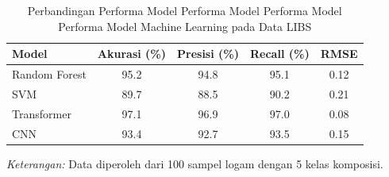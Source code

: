  \begin{table}[H]
    \centering
    \caption{Perbandingan Performa Model Performa Model Performa Model Performa Model Machine Learning pada Data LIBS}
    \label{tab:performa_ml}
    \centering
    \begin{tabular}{lcccc}
      \toprule
      Model & Akurasi (\%) & Presisi (\%) & Recall (\%) & RMSE \\
      \midrule
      Random Forest & 95.2 & 94.8 & 95.1 & 0.12 \\
      SVM & 89.7 & 88.5 & 90.2 & 0.21 \\
      Transformer & 97.1 & 96.9 & 97.0 & 0.08 \\
      CNN & 93.4 & 92.7 & 93.5 & 0.15 \\
      \bottomrule
    \end{tabular}
    
    \smallskip
    \footnotesize
    \textit{Keterangan:} Data diperoleh dari 100 sampel logam dengan 5 kelas komposisi.
  \end{table}

%
